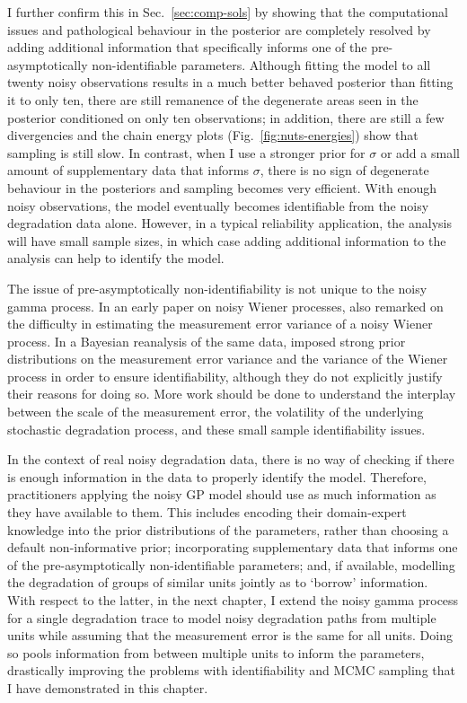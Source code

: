 I further confirm this in Sec.~\ref{sec:comp-sols} by showing that the computational issues and pathological behaviour in the posterior are completely resolved by adding additional information that specifically informs one of the pre-asymptotically non-identifiable parameters. Although fitting the model to all twenty noisy observations results in a much better behaved posterior than fitting it to only ten, there are still remanence of the degenerate areas seen in the posterior conditioned on only ten observations; in addition, there are still a few divergencies and the chain energy plots (Fig.~\ref{fig:nuts-energies}) show that sampling is still slow. In contrast, when I use a stronger prior for $\sigma$ or add a small amount of supplementary data that informs $\sigma$, there is no sign of degenerate behaviour in the posteriors and sampling becomes very efficient. With enough noisy observations, the model eventually becomes identifiable from the noisy degradation data alone. However, in a typical reliability application, the analysis will have small sample sizes, in which case adding additional information to the analysis can help to identify the model.

The issue of pre-asymptotically non-identifiability is not unique to the noisy gamma process. In an early paper on noisy Wiener processes, \citet{whitmore_1995} also remarked on the difficulty in estimating the measurement error variance of a noisy Wiener process. In a Bayesian reanalysis of the same data, \citet{hamada_2008} imposed strong prior distributions on the measurement error variance and the variance of the Wiener process in order to ensure identifiability, although they do not explicitly justify their reasons for doing so. More work should be done to understand the interplay between the scale of the measurement error, the volatility of the underlying stochastic degradation process, and these small sample identifiability issues.

In the context of real noisy degradation data, there is no way of checking if there is enough information in the data to properly identify the model. Therefore, practitioners applying the noisy GP model should use as much information as they have available to them. This includes encoding their domain-expert knowledge into the prior distributions of the parameters, rather than choosing a default non-informative prior; incorporating supplementary data that informs one of the pre-asymptotically non-identifiable parameters; and, if available, modelling the degradation of groups of similar units jointly as to `borrow' information. With respect to the latter, in the next chapter, I extend the noisy gamma process for a single degradation trace to model noisy degradation paths from multiple units while assuming that the measurement error is the same for all units. Doing so pools information from between multiple units to inform the parameters, drastically improving the problems with identifiability and MCMC sampling that I have demonstrated in this chapter.
